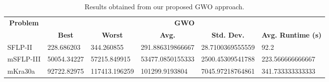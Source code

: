 \begin{table}[h!]
\begin{adjustwidth}{-1.18in}{}
\centering
\begin{tabular}{|l|l|l|l|l|l|}
	\hline
	\multicolumn{1}{|c|}{\multirow{2}{*}{\textbf{Problem}}} & \multicolumn{5}{c|}{\textbf{GWO}} \\ \cline{2-6} 
	\multicolumn{1}{|c|}{}                                  & \multicolumn{1}{c|}{\textbf{Best}} & \multicolumn{1}{c|}{\textbf{Worst}} & \multicolumn{1}{c|}{\textbf{Avg.}} & \multicolumn{1}{c|}{\textbf{Std. Dev.}} & \multicolumn{1}{c|}{\textbf{Avg. Runtime (s)}} \\ \hline
	SFLP-II                                                 & 228.686203                                  & 344.260855                                   & 291.886319866667                      & 28.7100369555559                                 & 92.2                                  \\ \hline
	mSFLP-III                                               & 50054.34227                                & 57215.849915                                 & 53477.0850155333						         & 2500.45309541788                              & 223.566666666667                               \\ \hline
	mKra30a                                               & 92722.82975                                & 117413.196259                                 &
	101299.9193804							&
	7045.97218764861							&
	341.733333333333						\\ \hline
\end{tabular}
\end{adjustwidth}
\caption{Results obtained from our proposed GWO approach.}
\label{approach-gwo-results}
\end{table}

